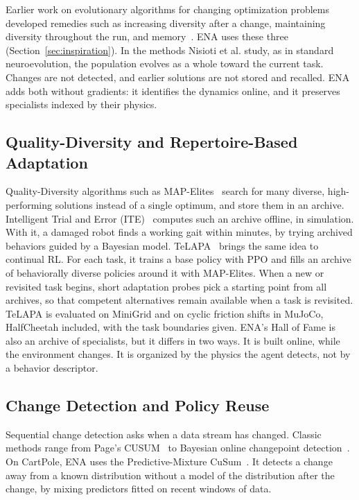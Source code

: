 Earlier work on evolutionary algorithms for changing optimization problems developed remedies such as increasing diversity after a change, maintaining diversity throughout the run, and memory~\citep{yazdani2021survey}. ENA uses these three (Section~\ref{sec:inspiration}). In the methods Nisioti et al. study, as in standard neuroevolution, the population evolves as a whole toward the current task. Changes are not detected, and earlier solutions are not stored and recalled. ENA adds both without gradients: it identifies the dynamics online, and it preserves specialists indexed by their physics.

\subsection{Quality-Diversity and Repertoire-Based Adaptation}
Quality-Diversity algorithms such as MAP-Elites~\citep{mouret2015illuminating} search for many diverse, high-performing solutions instead of a single optimum, and store them in an archive. Intelligent Trial and Error (ITE)~\citep{cully2015robots} computes such an archive offline, in simulation. With it, a damaged robot finds a working gait within minutes, by trying archived behaviors guided by a Bayesian model. TeLAPA~\citep{lillo2026beyond} brings the same idea to continual RL. For each task, it trains a base policy with PPO and fills an archive of behaviorally diverse policies around it with MAP-Elites. When a new or revisited task begins, short adaptation probes pick a starting point from all archives, so that competent alternatives remain available when a task is revisited. TeLAPA is evaluated on MiniGrid and on cyclic friction shifts in MuJoCo, HalfCheetah included, with the task boundaries given. ENA's Hall of Fame is also an archive of specialists, but it differs in two ways. It is built online, while the environment changes. It is organized by the physics the agent detects, not by a behavior descriptor.

\subsection{Change Detection and Policy Reuse}
Sequential change detection asks when a data stream has changed. Classic methods range from Page's CUSUM~\citep{page1954continuous} to Bayesian online changepoint detection~\citep{adams2007bayesian}. On CartPole, ENA uses the Predictive-Mixture CuSum~\citep{halme2026sequential}. It detects a change away from a known distribution without a model of the distribution after the change, by mixing predictors fitted on recent windows of data.

